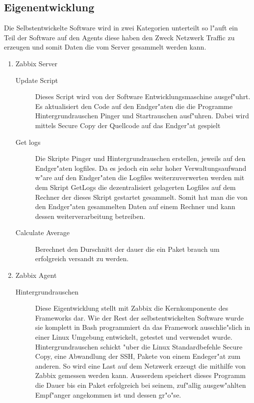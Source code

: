 \subsection{Eigenentwicklung}
Die Selbstentwickelte Software wird in zwei Kategorien unterteilt so l"auft ein Teil der Software %
auf den Agents diese haben den Zweck Netzwerk Traffic zu erzeugen und somit Daten die vom Server %
gesammelt werden kann.
\begin{enumerate}
\item Zabbix Server 
\begin{description}
\item[Update Script]Dieses Script wird von der Software Entwicklungsmaschine ausgef"uhrt. Es aktualisiert den Code auf den Endger"aten %
die die Programme Hintergrundrauschen Pinger und Startrauschen ausf"uhren. Dabei wird mittels Secure Copy %
der Quellcode auf das Endger"at gespielt

\item[Get logs]Die Skripte Pinger und Hintergrundrauschen erstellen, jeweils auf den Endger"aten logfiles. %
Da es jedoch ein sehr hoher Verwaltungsaufwand w"are auf den Endger"aten die Logfiles weiterzuverwerten %
werden mit dem Skript GetLogs die dezentralisiert gelagerten Logfiles auf dem Rechner der dieses Skript %
gestartet gesammelt. Somit hat man die von den Endger"aten gesammelten Daten auf einem Rechner und kann %
dessen weiterverarbeitung betreiben.      

\item[Calculate Average]Berechnet den Durschnitt der dauer die ein Paket brauch um erfolgreich versandt %
zu werden.
 
\end{description}
\item Zabbix Agent

\begin{description}
\item[Hintergrundrauschen]Diese Eigentwicklung stellt mit Zabbix die Kernkomponente des Frameworks dar. Wie %
der Rest der selbstentwickelten Software wurde sie komplett in Bash programmiert da das Framework ausschlie"slich %
in einer Linux Umgebung entwickelt, getestet und verwendet wurde. Hintergrundrauschen schickt "uber die Linux %
Standardbefehle Secure Copy, eine Abwandlung der SSH, Pakete von einem Endeger"at zum anderen. So wird eine %
Last auf dem Netzwerk erzeugt die mithilfe von Zabbix gemessen werden kann. Ausserdem speichert dieses Programm %
die Dauer bis ein Paket erfolgreich bei seinem, zuf"allig ausgew"ahlten Empf"anger angekommen ist und dessen gr"o"se. %


\end{description}
\end{enumerate}
